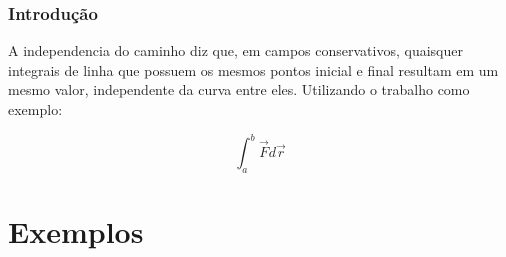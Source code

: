 \documentclass{beamer}
\begin{document}
\begin{frame}
% 
% 
% 
% 
% 
% 

\begin{frame}
    \frametitle{Introdução}
    A independencia do caminho diz que, em campos conservativos, quaisquer integrais de linha que possuem os mesmos pontos inicial e final resultam em um mesmo valor, independente da curva 
    entre eles. Utilizando o trabalho como exemplo:
    
    \begin{equation}
    \int_{a}^b \vec{F} d\vec{r}
    \end{equation}


% 

\end{frame}

\section{Exemplos}


\end{frame}
\end{document}
